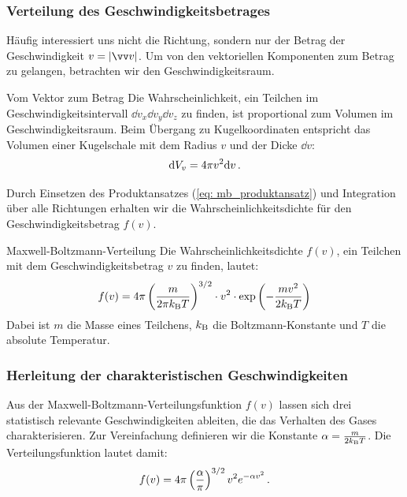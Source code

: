 \subsubsection{Verteilung des Geschwindigkeitsbetrages}\label{subsubsec: mb_betrag}
Häufig interessiert uns nicht die Richtung, sondern nur der Betrag der Geschwindigkeit $v = |\ivec{v}|$. Um von den vektoriellen Komponenten zum Betrag zu gelangen, betrachten wir den Geschwindigkeitsraum.
\begin{rememberbox}{Vom Vektor zum Betrag}
    Die Wahrscheinlichkeit, ein Teilchen im Geschwindigkeitsintervall $\dd v_x \dd v_y \dd v_z$ zu finden, ist proportional zum Volumen im Geschwindigkeitsraum. Beim Übergang zu Kugelkoordinaten entspricht das Volumen einer Kugelschale mit dem Radius $v$ und der Dicke $\dd v$:
    \begin{equation}\mathrm{d} V_v = 4\pi v^2 \mathrm{d} v \,.
    \end{equation}
\end{rememberbox}
Durch Einsetzen des Produktansatzes (\cref{eq: mb_produktansatz}) und Integration über alle Richtungen erhalten wir die Wahrscheinlichkeitsdichte für den Geschwindigkeitsbetrag $f(v)$.\begin{importantbox}{Maxwell-Boltzmann-Verteilung}
    Die Wahrscheinlichkeitsdichte $f(v)$, ein Teilchen mit dem Geschwindigkeitsbetrag $v$ zu finden, lautet:
    \begin{equation}\label{eq: maxwell_boltzmann_final}
        f(v) = 4\pi \left( \frac{m}{2\pi k_{\mathrm{B}} T} \right)^{3/2} \cdot v^2 \cdot \exp\left( - \frac{m v^2}{2 k_{\mathrm{B}} T} \right)
    \end{equation}
    Dabei ist $m$ die Masse eines Teilchens, $k_{\mathrm{B}}$ die Boltzmann-Konstante und $T$ die absolute Temperatur.
\end{importantbox}


\subsubsection{Herleitung der charakteristischen Geschwindigkeiten}\label{subsubsec: herleitungen_char_geschwindigkeiten_maxwell_boltzmann}

Aus der Maxwell-Boltzmann-Verteilungsfunktion $f(v)$ lassen sich drei statistisch relevante Geschwindigkeiten ableiten, die das Verhalten des Gases charakterisieren. Zur Vereinfachung definieren wir die Konstante $\alpha = \frac{m}{2 k_{\mathrm{B}} T}$. Die Verteilungsfunktion lautet damit:
\begin{equation}\label{eq: mb_verteilung_kurz}
    f(v) = 4\pi \left( \frac{\alpha}{\pi} \right)^{3/2} v^2 e^{-\alpha v^2} \,.
\end{equation}

